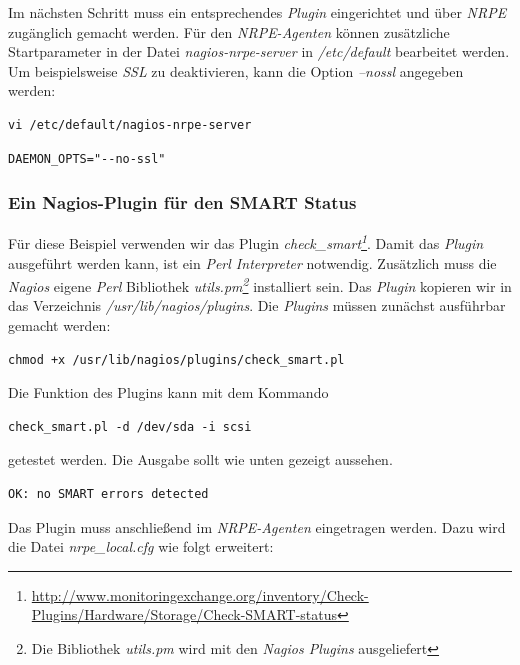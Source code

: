 Im nächsten Schritt muss ein entsprechendes \emph{Plugin} eingerichtet und über \emph{NRPE} zugänglich gemacht werden. Für den \emph{NRPE-Agenten} können zusätzliche Startparameter in der Datei \emph{nagios-nrpe-server} in \emph{/etc/default} bearbeitet werden. Um beispielsweise \emph{SSL} zu deaktivieren, kann die Option \emph{--nossl} angegeben werden:

\begin{lstlisting}[numbers=none]
vi /etc/default/nagios-nrpe-server
\end{lstlisting}

\begin{lstlisting}[numbers=none]
DAEMON_OPTS="--no-ssl"
\end{lstlisting}

\subsubsection{Ein Nagios-Plugin für den SMART Status}
Für diese Beispiel verwenden wir das Plugin \emph{check\_smart\footnote{\url{http://www.monitoringexchange.org/inventory/Check-Plugins/Hardware/Storage/Check-SMART-status}}}. Damit das \emph{Plugin} ausgeführt werden kann, ist ein \emph{Perl Interpreter} notwendig. Zusätzlich muss die \emph{Nagios} eigene \emph{Perl} Bibliothek \emph{utils.pm\footnote{Die Bibliothek \emph{utils.pm} wird mit den \emph{Nagios Plugins} ausgeliefert}} installiert sein. Das \emph{Plugin} kopieren wir in das Verzeichnis \emph{/usr/lib/nagios/plugins}. Die \emph{Plugins} müssen zunächst ausführbar gemacht werden:

\begin{lstlisting}[numbers=none]
chmod +x /usr/lib/nagios/plugins/check_smart.pl
\end{lstlisting}

Die Funktion des Plugins kann mit dem Kommando

\begin{lstlisting}[numbers=none]
check_smart.pl -d /dev/sda -i scsi
\end{lstlisting}

getestet werden. Die Ausgabe sollt wie unten gezeigt aussehen.

\begin{lstlisting}[numbers=none]
OK: no SMART errors detected
\end{lstlisting}

Das Plugin muss anschließend im \emph{NRPE-Agenten} eingetragen werden. Dazu wird die Datei \emph{nrpe\_local.cfg} wie folgt erweitert:

